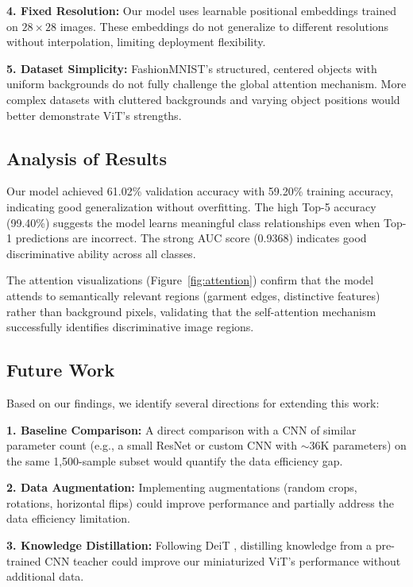 \documentclass{article}
\begin{document}
\textbf{4. Fixed Resolution:} Our model uses learnable positional embeddings trained on $28 \times 28$ images. These embeddings do not generalize to different resolutions without interpolation, limiting deployment flexibility.

\textbf{5. Dataset Simplicity:} FashionMNIST's structured, centered objects with uniform backgrounds do not fully challenge the global attention mechanism. More complex datasets with cluttered backgrounds and varying object positions would better demonstrate ViT's strengths.

\subsection{Analysis of Results}

Our model achieved 61.02\% validation accuracy with 59.20\% training accuracy, indicating good generalization without overfitting. The high Top-5 accuracy (99.40\%) suggests the model learns meaningful class relationships even when Top-1 predictions are incorrect. The strong AUC score (0.9368) indicates good discriminative ability across all classes.

The attention visualizations (Figure~\ref{fig:attention}) confirm that the model attends to semantically relevant regions (garment edges, distinctive features) rather than background pixels, validating that the self-attention mechanism successfully identifies discriminative image regions.

\subsection{Future Work}

Based on our findings, we identify several directions for extending this work:

\textbf{1. Baseline Comparison:} A direct comparison with a CNN of similar parameter count (e.g., a small ResNet or custom CNN with $\sim$36K parameters) on the same 1,500-sample subset would quantify the data efficiency gap.

\textbf{2. Data Augmentation:} Implementing augmentations (random crops, rotations, horizontal flips) could improve performance and partially address the data efficiency limitation.

\textbf{3. Knowledge Distillation:} Following DeiT \citep{touvron2021deit}, distilling knowledge from a pre-trained CNN teacher could improve our miniaturized ViT's performance without additional data.
\end{document}
